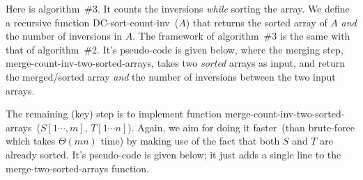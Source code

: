 Here is algorithm~\#3. It counts the inversions \emph{while} sorting the array.
We define a recursive function DC-sort-count-inv~($A$) that returns the sorted array of $A$ \emph{and}
the number of inversions in $A$. The framework of algorithm~\#3 is the same with that of algorithm~\#2. 
It's pseudo-code is given below, where the merging step, merge-count-inv-two-sorted-arrays, takes two \emph{sorted} arrays
as input, and return the merged/sorted array \emph{and} the number of inversions between the two input arrays.

\begin{minipage}{0.8\textwidth}
	\xxx
	\xxx
	\xxx
	\xxx
	\xxx
	\xxx
	\xxx
\end{minipage}

The remaining (key) step is to implement function merge-count-inv-two-sorted-arrays~($S[1\cdots, m]$, $T[1\cdots n]$).
Again, we aim for doing it faster~(than brute-force which takes $\Theta(mn)$ time) by making use of the fact that
both $S$ and $T$ are already sorted. It's pseudo-code is given below; it just adds a single line to the merge-two-sorted-arrays function.

\begin{minipage}{0.8\textwidth}
        \xxx
        \xxx
        \xxx
        \aab {\textcolor{blue}{init inv = 0;}}\xxx
        \xxx
        \xxx
        \xxx
        \xxx
        \xxx
        \xxx
        \xxx
        \xxx
        \aad {\textcolor{blue}{inv = inv + $(m-i+1)$};}\xxx
        \xxx
        \xxx
        \aab {\textcolor{blue}{return $(C, inv)$};}\xxx
        \xxx
\end{minipage}

